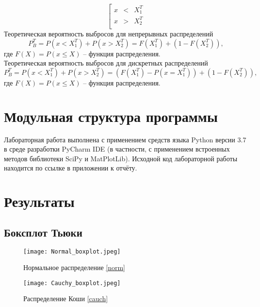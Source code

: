 \documentclass[a4paper]{article}
\begin{document}
        \begin{equation} \label{vibrosy}
            \left[
              \begin{array}{ccc}
                 x & < & X^T_1 \\
                 x & > & X^T_2 \\
              \end{array}
            \right.
        \end{equation}
        Теоретическая вероятность выбросов для непрерывных распределений
        \begin{equation}\label{nepreriv}
            P^T_B = P(x < X^T_1) + P(x > X^T_2) = F(X^T_1) + (1 - F(X^T_2)),
        \end{equation}
        где $F(X) = P(x \leq X)$ -- функция распределения.\\
        Теоретическая вероятность выбросов для дискретных распределений
        \begin{equation}\label{discret}
            P^T_B = P(x < X^T_1) + P(x > X^T_2) = (F(X^T_1) - P(x = X^T_1) ) + (1 - F(X^T_2)),
        \end{equation}
        где $F(X) = P(x \leq X)$ -- функция распределения.

\section{Модульная структура программы}
Лабораторная работа выполнена с применением средств языка Python версии 3.7 в среде разработки PyCharm IDE (в частности, с применением встроенных методов библиотеки SciPy и MatPlotLib). Исходной код лабораторной работы находится по ссылке в приложении к отчёту.
\section{Результаты}
    \subsection{Боксплот Тьюки}
        \begin{figure}[H]
            \centering
            \texttt{[image: Normal\_boxplot.jpeg]}
            \caption{Нормальное распределение \eqref{norm}}
            \label{fig:normal}
        \end{figure}
        
        \begin{figure}[H]
            \centering
            \texttt{[image: Cauchy\_boxplot.jpeg]}
            \caption{Распределение Коши \eqref{cauch}}
            \label{fig:cauchy}
        \end{figure}
        
\end{document}
